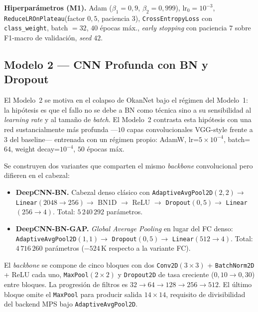 \documentclass[conference]{IEEEtran}
\begin{document}
\textbf{Hiperparámetros (M1).} Adam ($\beta_1{=}0{,}9$,
$\beta_2{=}0{,}999$), lr$_0{=}10^{-3}$,
\texttt{ReduceLROnPlateau}(factor $0{,}5$, paciencia $3$),
\texttt{CrossEntropyLoss} con \texttt{class\_weight}, batch
$=32$, $40$ épocas máx., \textit{early stopping} con paciencia
$7$ sobre F1-macro de validación, \textit{seed} $42$.

\subsection{Modelo 2 --- CNN Profunda con BN y Dropout}
\label{sec:art-m2}

El Modelo~2 se motiva en el colapso de OkanNet bajo el régimen
del Modelo~1: la hipótesis es que el fallo no se debe a BN como
técnica sino a su sensibilidad al \textit{learning rate}
y al tamaño de \textit{batch}. El Modelo~2 contrasta esta
hipótesis con una red sustancialmente más profunda
---$10$ capas convolucionales VGG-style frente a $3$ del
baseline--- entrenada con un régimen propio: AdamW,
lr=$5{\times}10^{-4}$, batch=$64$, weight decay=$10^{-4}$,
$50$ épocas máx.

Se construyen dos variantes que comparten el mismo
\textit{backbone} convolucional pero difieren en el cabezal:

\begin{itemize}
  \item \textbf{DeepCNN-BN.} Cabezal denso clásico con
        \texttt{AdaptiveAvgPool2D}$(2,2) \to$
        \texttt{Linear}$(2048{\to}256) \to$ BN1D $\to$ ReLU $\to$
        \texttt{Dropout}$(0{,}5) \to$ \texttt{Linear}$(256{\to}4)$.
        Total: $5\,240\,292$ parámetros.
  \item \textbf{DeepCNN-BN-GAP.} \textit{Global Average
        Pooling} en lugar del FC denso:
        \texttt{AdaptiveAvgPool2D}$(1,1) \to$
        \texttt{Dropout}$(0{,}5) \to$ \texttt{Linear}$(512{\to}4)$.
        Total: $4\,716\,260$ parámetros ($-524$\,K respecto a
        la variante FC).
\end{itemize}

El \textit{backbone} se compone de cinco bloques con dos
\texttt{Conv2D}$(3{\times}3)$ + \texttt{BatchNorm2D} + ReLU
cada uno, \texttt{MaxPool}$(2{\times}2)$ y \texttt{Dropout2D}
de tasa creciente ($0{,}10 \to 0{,}30$) entre bloques. La
progresión de filtros es $32{\to}64{\to}128{\to}256{\to}512$.
El último bloque omite el \texttt{MaxPool} para producir
salida $14{\times}14$, requisito de divisibilidad del backend
MPS bajo \texttt{AdaptiveAvgPool2D}.
\end{document}

